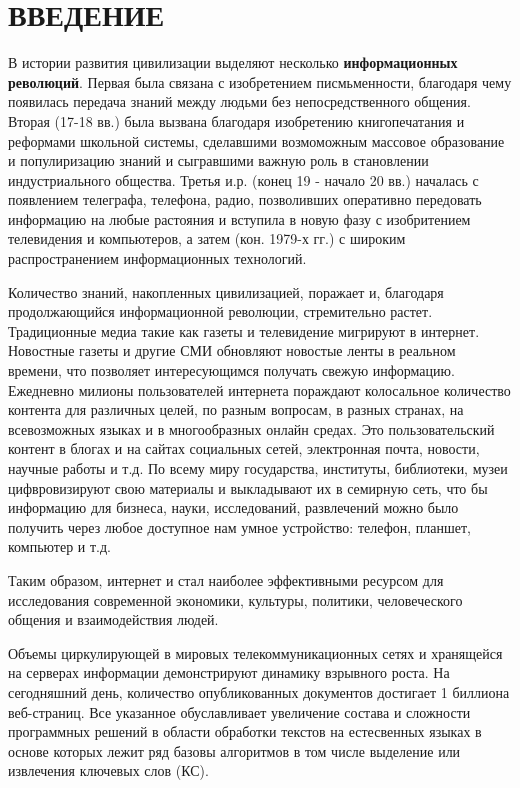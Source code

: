 \chapter*{ВВЕДЕНИЕ}
В истории развития цивилизации выделяют несколько \textbf{информационных революций}.
Первая была связана с изобретением писмьменности, благодаря чему появилась передача знаний между людьми без непосредственного общения.
Вторая (17-18 вв.) была вызвана благодаря изобретению книгопечатания и реформами школьной системы, сделавшими возмоможным массовое образование и популиризацию знаний и сыгравшими важную роль в становлении индустриального общества.
Третья и.р. (конец 19 - начало 20 вв.) началась с появлением телеграфа, телефона, радио, позволивших оперативно передовать информацию на любые растояния и вступила в новую фазу с изобритением телевидения и компьютеров, а затем (кон. 1979-х гг.) с широким распространением информационных технологий. \cite{16}

Количество знаний, накопленных цивилизацией, поражает и, благодаря продолжающийся информационной революции, стремительно растет.
Традиционные медиа такие как газеты и телевидение мигрируют в интернет.
Новостные газеты и другие СМИ обновляют новостые ленты в реальном времени, что позволяет интересующимся получать свежую информацию.
Ежедневно милионы пользователей интернета пораждают колосальное количество контента для различных целей, по разным вопросам, в разных странах, на всевозможных языках и в многообразных онлайн средах.
Это пользовательский контент в блогах и на сайтах социальных сетей, электронная почта, новости, научные работы и т.д.
По всему миру государства, институты, библиотеки, музеи цифвровизируют свою материалы и выкладывают их в семирную сеть, что бы информацию для бизнеса, науки, исследований, развлечений можно было получить через любое доступное нам умное устройство: телефон, планшет, компьютер и т.д. \cite{2}

Таким образом, интернет и стал наиболее эффективными ресурсом для исследования современной экономики, культуры, политики, человеческого общения и взаимодействия людей. \cite{2}

Объемы циркулирующей в мировых телекоммуникационных сетях и хранящейся на серверах информации демонстрируют динамику взрывного роста.
На сегодняшний день, количество опубликованных документов достигает 1 биллиона веб-страниц.
Все указанное обуславливает увеличение состава и сложности программных решений в области обработки текстов на естесвенных языках в основе которых лежит ряд базовы алгоритмов в том числе выделение или извлечения ключевых слов (КС).

